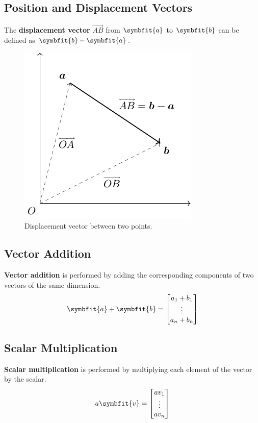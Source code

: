 \documentclass{article}
\begin{document}
\subsection{Position and Displacement Vectors}
\begin{definition}
    The \textbf{displacement vector} \(\overrightarrow{AB}\) from
    \(\symbfit{a}\) to \(\symbfit{b}\) can be defined as
    \(\symbfit{b}-\symbfit{a}\).
    \begin{figure}[H]
        \centering
        \includegraphics*{figures/vector_position.pdf}
        \caption{Displacement vector between two points.}
    \end{figure}
\end{definition}
\subsection{Vector Addition}
\begin{definition}
    \textbf{Vector addition} is performed by adding the corresponding
    components of two vectors of the same dimension.
    \begin{equation*}
        \symbfit{a} + \symbfit{b} =
        \begin{bmatrix}
            a_1+b_1 \\
            \vdots  \\
            a_n+b_n
        \end{bmatrix}
    \end{equation*}
\end{definition}
\subsection{Scalar Multiplication}
\begin{definition}
    \textbf{Scalar multiplication} is performed by multiplying each
    element of the vector by the scalar.
    \begin{equation*}
        a\symbfit{v} =
        \begin{bmatrix}
            av_1   \\
            \vdots \\
            av_n
        \end{bmatrix}
    \end{equation*}
\end{definition}
\end{document}
